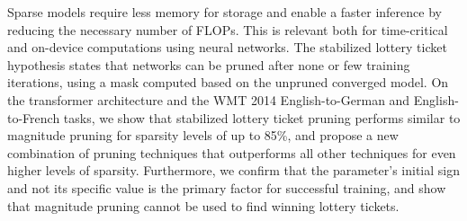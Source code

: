Sparse models require less memory for storage and enable a faster inference by reducing the necessary number of FLOPs. This is relevant both for time-critical and on-device computations using neural networks. The stabilized lottery ticket hypothesis states that networks can be pruned after none or few training iterations, using a mask computed based on the unpruned converged model. On the transformer architecture and the WMT 2014 English-to-German and English-to-French tasks, we show that stabilized lottery ticket pruning performs similar to magnitude pruning for sparsity levels of up to 85\%, and propose a new combination of pruning techniques that outperforms all other techniques for even higher levels of sparsity. Furthermore, we confirm that the parameter's initial sign and not its specific value is the primary factor for successful training, and show that magnitude pruning cannot be used to find winning lottery tickets.

